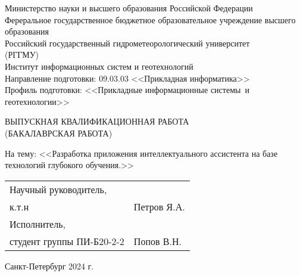 \newcommand{\signplace}{\underline{\hspace{40mm}}}
\newcommand{\dateblank}{%
    <<\underline{\hspace{10mm}}>> \underline{\hspace{30mm}} 2024 г.%
}
\newlength{\twointerv}\setlength{\twointerv}{28.34pt}

\begin{titlepage}
    \singlespacing
    \setlength{\parindent}{0pt}
    \begin{center}
        Министерство науки и высшего образования Российской Федерации\\
        Фереральное государственное бюджетное образовательное учреждение
высшего образования\\
        Российский государственный гидрометеорологический университет\\
        (РГГМУ)\\
        Институт информационных систем и геотехнологий\\
        Направление подготовки: 09.03.03 <<Прикладная информатика>>\\
        Профиль подготовки: <<Прикладные информационные системы\
        и геотехнологии>>

    \end{center}
    \vspace{\oneinterv}
    \begin{center}
    ВЫПУСКНАЯ КВАЛИФИКАЦИОННАЯ РАБОТА\\
    (БАКАЛАВРСКАЯ РАБОТА)
    \end{center}
    \vspace{\oneinterv}
    На тему: <<Разработка приложения интеллектуального ассистента на базе
    технологий глубокого обучения.>>
    \vspace{\twointerv}

    \vfill

    \begin{tabular}{N{70mm}N{80mm}}
        Научный руководитель,\\
        к.т.н & \signplace{}Петров Я.А.\\
        \vspace{5mm}
        Исполнитель,\\студент группы ПИ-Б20-2-2 & \signplace{} Попов В.Н.
    \end{tabular}

    \vfill

    \begin{center}
        Санкт-Петербург 2024 г.
    \end{center}
\end{titlepage}
\setcounter{page}{2}
\pagestyle{}
